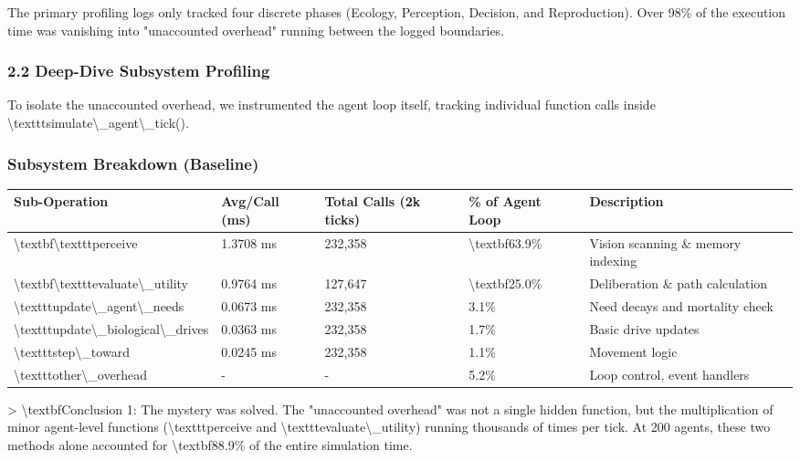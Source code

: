 \documentclass[11pt,a4paper]{article}
\begin{document}
The primary profiling logs only tracked four discrete phases (Ecology, Perception, Decision, and Reproduction). Over 98\% of the execution time was vanishing into "unaccounted overhead" running between the logged boundaries.

\subsubsection*{2.2 Deep-Dive Subsystem Profiling}
To isolate the unaccounted overhead, we instrumented the agent loop itself, tracking individual function calls inside \textbackslash{}texttt{simulate\textbackslash{}\_agent\textbackslash{}\_tick()}. 

\subsubsection*{Subsystem Breakdown (Baseline)}
\begin{longtable}{lllll}
\toprule
Sub-Operation & Avg/Call (ms) & Total Calls (2k ticks) & \% of Agent Loop & Description \\
\midrule
\endhead
\textbackslash{}textbf{\textbackslash{}texttt{perceive}} & 1.3708 ms & 232,358 & \textbackslash{}textbf{63.9\%} & Vision scanning \& memory indexing \\
\textbackslash{}textbf{\textbackslash{}texttt{evaluate\textbackslash{}\_utility}} & 0.9764 ms & 127,647 & \textbackslash{}textbf{25.0\%} & Deliberation \& path calculation \\
\textbackslash{}texttt{update\textbackslash{}\_agent\textbackslash{}\_needs} & 0.0673 ms & 232,358 & 3.1\% & Need decays and mortality check \\
\textbackslash{}texttt{update\textbackslash{}\_biological\textbackslash{}\_drives} & 0.0363 ms & 232,358 & 1.7\% & Basic drive updates \\
\textbackslash{}texttt{step\textbackslash{}\_toward} & 0.0245 ms & 232,358 & 1.1\% & Movement logic \\
\textbackslash{}texttt{other\textbackslash{}\_overhead} & - & - & 5.2\% & Loop control, event handlers \\
\bottomrule
\end{longtable}

\textgreater{} \textbackslash{}textbf{Conclusion 1:} The mystery was solved. The "unaccounted overhead" was not a single hidden function, but the multiplication of minor agent-level functions (\textbackslash{}texttt{perceive} and \textbackslash{}texttt{evaluate\textbackslash{}\_utility}) running thousands of times per tick. At 200 agents, these two methods alone accounted for \textbackslash{}textbf{88.9\%} of the entire simulation time.
\end{document}
